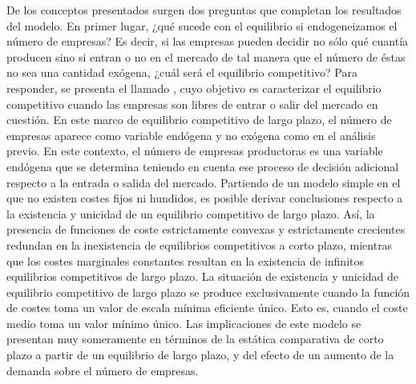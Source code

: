 \documentclass{nuevotema}
\begin{document}
De los conceptos presentados surgen dos preguntas que completan los resultados del modelo. En primer lugar, {¿qué sucede con el equilibrio si endogeneizamos el número de empresas?} Es decir, si las empresas pueden decidir no sólo qué cuantía producen sino si entran o no en el mercado de tal manera que el número de éstas no sea una cantidad exógena, {¿cuál será el equilibrio competitivo?} Para responder, se presenta el llamado , cuyo objetivo es caracterizar el equilibrio competitivo cuando las empresas son libres de entrar o salir del mercado en cuestión. En este marco de equilibrio competitivo de largo plazo, el número de empresas aparece como variable endógena y no exógena como en el análisis previo. En este contexto, el número de empresas productoras es una variable endógena que se determina teniendo en cuenta ese proceso de decisión adicional respecto a la entrada o salida del mercado. Partiendo de un modelo simple en el que no existen costes fijos ni hundidos, es posible derivar conclusiones respecto a la existencia y unicidad de un equilibrio competitivo de largo plazo. Así, la presencia de funciones de coste estrictamente convexas y estrictamente crecientes redundan en la inexistencia de equilibrios competitivos a corto plazo, mientras que los costes marginales constantes resultan en la existencia de infinitos equilibrios competitivos de largo plazo. La situación de existencia y unicidad de equilibrio competitivo de largo plazo se produce exclusivamente cuando la función de costes toma un valor de escala mínima eficiente único. Esto es, cuando el coste medio toma un valor mínimo único. Las implicaciones de este modelo se presentan muy someramente en términos de la estática comparativa de corto plazo a partir de un equilibrio de largo plazo, y del efecto de un aumento de la demanda sobre el número de empresas.
\end{document}
